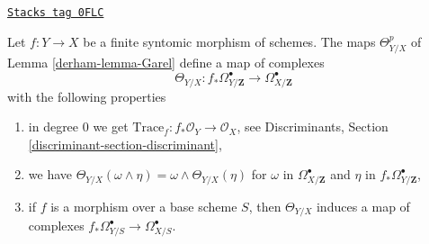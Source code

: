 \begin{proposition}[Garel]
\label{derham-proposition-Garel}
\href{https://stacks.math.columbia.edu/tag/0FLC}{\texttt{Stacks tag 0FLC}}

\begin{reference}
\cite{Garel}
\end{reference}
Let $f : Y \to X$ be a finite syntomic morphism of schemes.
The maps $\Theta^p_{Y/X}$ of Lemma \ref{derham-lemma-Garel} define a map of complexes
$$
\Theta_{Y/X} :
f_*\Omega^\bullet_{Y/\mathbf{Z}}
\longrightarrow
\Omega^\bullet_{X/\mathbf{Z}}
$$
with the following properties
\begin{enumerate}
\item in degree $0$ we get
$\text{Trace}_f : f_*\mathcal{O}_Y \to \mathcal{O}_X$, see
Discriminants, Section \ref{discriminant-section-discriminant},
\item we have
$\Theta_{Y/X}(\omega \wedge \eta) = \omega \wedge \Theta_{Y/X}(\eta)$
for $\omega$ in $\Omega^\bullet_{X/\mathbf{Z}}$ and $\eta$
in $f_*\Omega^\bullet_{Y/\mathbf{Z}}$,
\item if $f$ is a morphism over a base scheme $S$, then
$\Theta_{Y/X}$ induces a map of complexes
$f_*\Omega^\bullet_{Y/S} \to \Omega^\bullet_{X/S}$.
\end{enumerate}
\end{proposition}

